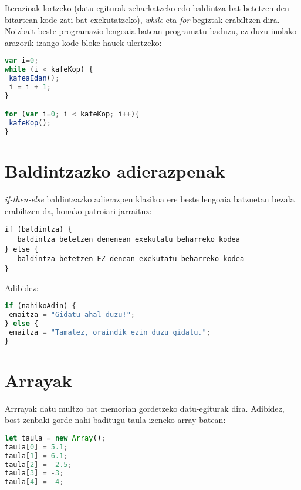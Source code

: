 Iterazioak lortzeko (datu-egiturak zeharkatzeko edo baldintza bat betetzen den bitartean kode zati bat exekutatzeko), \textit{while} eta \textit{for} begiztak erabiltzen dira. Noizbait beste programazio-lengoaia batean programatu baduzu, ez duzu inolako arazorik izango kode bloke hauek ulertzeko:

\begin{minipage}{\linewidth}
\begin{lstlisting}[language=JavaScript]
var i=0;
while (i < kafeKop) {
 kafeaEdan();
 i = i + 1;
}

for (var i=0; i < kafeKop; i++){
 kafeKop();
}
\end{lstlisting}
\end{minipage}

\section{Baldintzazko adierazpenak}
\textit{if-then-else} baldintzazko adierazpen klasikoa ere beste lengoaia batzuetan bezala erabiltzen da, honako patroiari jarraituz:

\begin{verbatim}
if (baldintza) {
   baldintza betetzen denenean exekutatu beharreko kodea
} else {
   baldintza betetzen EZ denean exekutatu beharreko kodea
}
\end{verbatim}

Adibidez:

\begin{lstlisting}[language=JavaScript]
if (nahikoAdin) {
 emaitza = "Gidatu ahal duzu!";
} else {
 emaitza = "Tamalez, oraindik ezin duzu gidatu.";
}
\end{lstlisting}

\section{Arrayak}
Arrrayak datu multzo bat memorian gordetzeko datu-egiturak dira. Adibidez, bost zenbaki gorde nahi baditugu taula izeneko array batean:

\begin{lstlisting}[language=JavaScript]
let taula = new Array();
taula[0] = 5.1;
taula[1] = 6.1;
taula[2] = -2.5;
taula[3] = -3;
taula[4] = -4;
\end{lstlisting}
 

